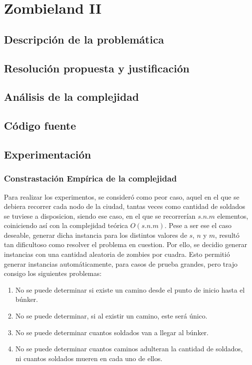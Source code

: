 \section{Zombieland II}
\subsection{Descripci\'on de la problem\'atica}
\subsection{Resoluci\'on propuesta y justificaci\'on}
\subsection{An\'alisis de la complejidad}
\subsection{C\'odigo fuente}
\subsection{Experimentaci\'on}
\subsubsection{Constrastaci\'on Emp\'irica de la complejidad}
Para realizar los experimentos, se consideró como peor caso, aquel en el que se debiera recorrer cada nodo de la ciudad, tantas veces como cantidad de soldados se tuviese a disposicion, siendo ese caso, en el que se recorrerían $s.n.m$ elementos, coiniciendo así con la complejidad teórica $O(s.n.m)$.
Pese a ser ese el caso deseable, generar dicha instancia para los distintos valores de $s$, $n$ y $m$, resultó tan dificultoso como resolver el problema en cuestion.
Por ello, se decidio generar instancias con una cantidad aleatoria de zombies por cuadra. Esto permitió generar instancias automáticamente, para casos de prueba grandes, pero trajo consigo los siguientes problemas:
\begin{enumerate}
	\item No se puede determinar si existe un camino desde el punto de inicio hasta el búnker.
	\item No se puede determinar, si al existir un camino, este será único.
	\item No se puede determinar cuantos soldados van a llegar al búnker.
	\item No se puede determinar cuantos caminos adulteran la cantidad de soldados, ni cuantos soldados mueren en cada uno de ellos.
\end{enumerate}

